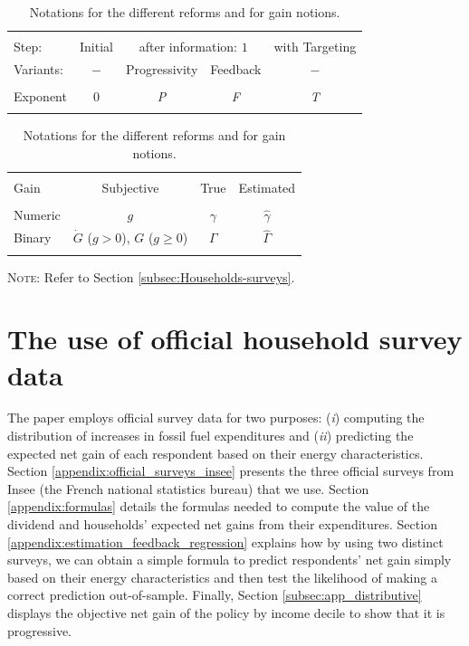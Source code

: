 \documentclass[12pt]{article} %
\begin{document}
\begin{appendices}
\begin{table}[H]
\caption{Notations for the different reforms and for gain notions.}
\label{tab:notations} %

\centering \begin{tabular}{lcccc}
\\[-2.1ex]\hline 
\hline\\[-2.8ex] Step: & Initial & \multicolumn{2}{c}{after information: $1$} & with Targeting\tabularnewline

Variants: & $-$ & Progressivity & Feedback & $-$\tabularnewline
 \hline \\[-2.6ex] 
Exponent & $0$ & \emph{P} & \emph{F} & \emph{T} \\ 
\hline 
\hline \\[-2.1ex] 
\end{tabular}

\medskip

\centering \begin{tabular}{lccc}
\\[-1.8ex]\hline 
\hline \\[-2.8ex] 
Gain & Subjective & True & Estimated\tabularnewline
 \hline \\[-2.6ex] 
Numeric & $g$ & $\gamma$ & $\widehat{\gamma}$\tabularnewline
Binary & $\dot{G}$ ($g>0$), $G$ ($g\geq0$) & $\Gamma$ & $\widehat{\Gamma}$ \\ 
\hline 
\hline \\[-1.8ex] 
\end{tabular}
     {\footnotesize \parbox[t]{7.5cm } {\linespread{1.2}\selectfont \textsc{Note:} Refer to Section \vref{subsec:Households-surveys}.}} 
\end{table}

\section{The use of official household survey data \label{subsec:app_estimation_feedback}}


The paper employs official survey data for two purposes: (\textit{i}) computing the distribution of increases in fossil fuel expenditures and (\textit{ii}) predicting the expected net gain of each respondent based on their energy characteristics. Section \ref{appendix:official_surveys_insee} presents the three official surveys from Insee (the French national statistics bureau) that we use. Section \ref{appendix:formulas} details the formulas needed to compute the value of the dividend and households' expected net gains from their expenditures. Section \ref{appendix:estimation_feedback_regression} explains how by using two distinct surveys, we can obtain a simple formula to predict respondents' net gain simply based on their energy characteristics and then test the likelihood of making a correct prediction out-of-sample. Finally, Section \ref{subsec:app_distributive} displays the objective net gain of the policy by income decile to show that it is progressive.

\end{appendices}
\end{document}

